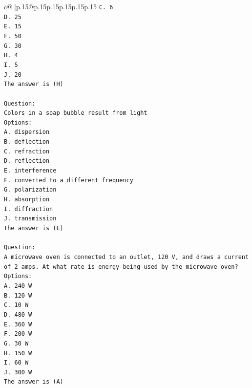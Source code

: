 \documentclass{article}
\begin{document}
{\begin{supertabular}{c@{$\;$}|p{.15\linewidth}@{}p{.15\linewidth}p{.15\linewidth}p{.15\linewidth}p{.15\linewidth}p{.15\linewidth}}
{{{\texttt{C. 6} \\
\texttt{D. 25} \\
\texttt{E. 15} \\
\texttt{F. 50} \\
\texttt{G. 30} \\
\texttt{H. 4} \\
\texttt{I. 5} \\
\texttt{J. 20} \\
\texttt{The answer is (H)} \\
\\ 
\texttt{Question:} \\
\texttt{Colors in a soap bubble result from light} \\
\texttt{Options:} \\
\texttt{A. dispersion} \\
\texttt{B. deflection} \\
\texttt{C. refraction} \\
\texttt{D. reflection} \\
\texttt{E. interference} \\
\texttt{F. converted to a different frequency} \\
\texttt{G. polarization} \\
\texttt{H. absorption} \\
\texttt{I. diffraction} \\
\texttt{J. transmission} \\
\texttt{The answer is (E)} \\
\\ 
\texttt{Question:} \\
\texttt{A microwave oven is connected to an outlet, 120 V, and draws a current of 2 amps. At what rate is energy being used by the microwave oven?} \\
\texttt{Options:} \\
\texttt{A. 240 W} \\
\texttt{B. 120 W} \\
\texttt{C. 10 W} \\
\texttt{D. 480 W} \\
\texttt{E. 360 W} \\
\texttt{F. 200 W} \\
\texttt{G. 30 W} \\
\texttt{H. 150 W} \\
\texttt{I. 60 W} \\
\texttt{J. 300 W} \\
\texttt{The answer is (A)} \\
\\ 
}}}
\end{supertabular}}
\end{document}
